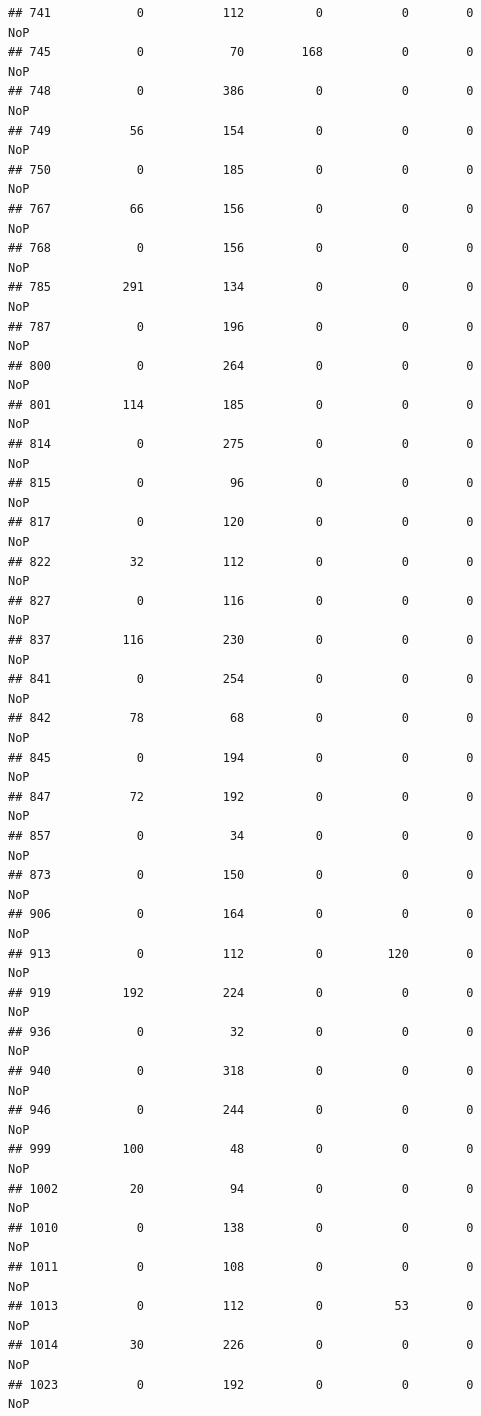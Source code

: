 \documentclass[]{article}
\begin{document}
\begin{verbatim}
## 741            0           112          0           0        0    NoP
## 745            0            70        168           0        0    NoP
## 748            0           386          0           0        0    NoP
## 749           56           154          0           0        0    NoP
## 750            0           185          0           0        0    NoP
## 767           66           156          0           0        0    NoP
## 768            0           156          0           0        0    NoP
## 785          291           134          0           0        0    NoP
## 787            0           196          0           0        0    NoP
## 800            0           264          0           0        0    NoP
## 801          114           185          0           0        0    NoP
## 814            0           275          0           0        0    NoP
## 815            0            96          0           0        0    NoP
## 817            0           120          0           0        0    NoP
## 822           32           112          0           0        0    NoP
## 827            0           116          0           0        0    NoP
## 837          116           230          0           0        0    NoP
## 841            0           254          0           0        0    NoP
## 842           78            68          0           0        0    NoP
## 845            0           194          0           0        0    NoP
## 847           72           192          0           0        0    NoP
## 857            0            34          0           0        0    NoP
## 873            0           150          0           0        0    NoP
## 906            0           164          0           0        0    NoP
## 913            0           112          0         120        0    NoP
## 919          192           224          0           0        0    NoP
## 936            0            32          0           0        0    NoP
## 940            0           318          0           0        0    NoP
## 946            0           244          0           0        0    NoP
## 999          100            48          0           0        0    NoP
## 1002          20            94          0           0        0    NoP
## 1010           0           138          0           0        0    NoP
## 1011           0           108          0           0        0    NoP
## 1013           0           112          0          53        0    NoP
## 1014          30           226          0           0        0    NoP
## 1023           0           192          0           0        0    NoP

\end{verbatim}
\end{document}
